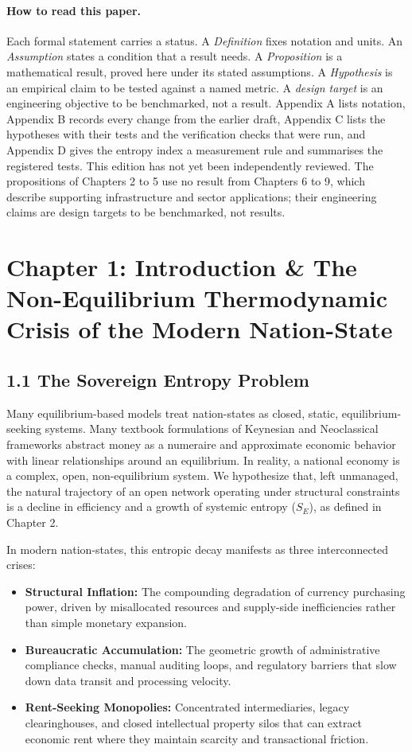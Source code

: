 \documentclass[11pt,a4paper]{article}
\theoremstyle{definition}
\theoremstyle{plain}
\theoremstyle{remark}
\begin{document}
\paragraph{How to read this paper.} Each formal statement carries a status. A \emph{Definition} fixes notation and units. An \emph{Assumption} states a condition that a result needs. A \emph{Proposition} is a mathematical result, proved here under its stated assumptions. A \emph{Hypothesis} is an empirical claim to be tested against a named metric. A \emph{design target} is an engineering objective to be benchmarked, not a result. Appendix A lists notation, Appendix B records every change from the earlier draft, Appendix C lists the hypotheses with their tests and the verification checks that were run, and Appendix D gives the entropy index a measurement rule and summarises the registered tests. This edition has not yet been independently reviewed. The propositions of Chapters 2 to 5 use no result from Chapters 6 to 9, which describe supporting infrastructure and sector applications; their engineering claims are design targets to be benchmarked, not results.

\clearpage
\clearpage
\section*{Chapter 1: Introduction \& The Non-Equilibrium Thermodynamic Crisis of the Modern Nation-State}

\subsection*{1.1 The Sovereign Entropy Problem}
Many equilibrium-based models treat nation-states as closed, static, equilibrium-seeking systems. Many textbook formulations of Keynesian and Neoclassical frameworks abstract money as a numeraire and approximate economic behavior with linear relationships around an equilibrium. In reality, a national economy is a complex, open, non-equilibrium system. We hypothesize that, left unmanaged, the natural trajectory of an open network operating under structural constraints is a decline in efficiency and a growth of systemic entropy ($S_E$), as defined in Chapter 2.

In modern nation-states, this entropic decay manifests as three interconnected crises:
\begin{itemize}
\item \textbf{Structural Inflation:} The compounding degradation of currency purchasing power, driven by misallocated resources and supply-side inefficiencies rather than simple monetary expansion.
\item \textbf{Bureaucratic Accumulation:} The geometric growth of administrative compliance checks, manual auditing loops, and regulatory barriers that slow down data transit and processing velocity.
\item \textbf{Rent-Seeking Monopolies:} Concentrated intermediaries, legacy clearinghouses, and closed intellectual property silos that can extract economic rent where they maintain scarcity and transactional friction.
\end{itemize}
\end{document}
